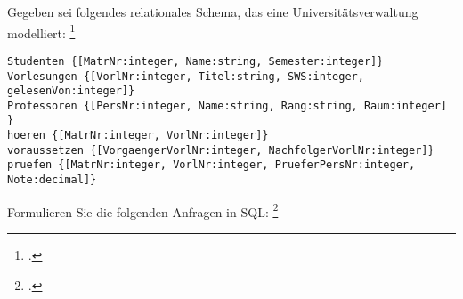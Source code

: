 \documentclass{bschlangaul-aufgabe}
\begin{document}

Gegeben sei folgendes relationales Schema, das eine
Universitätsverwaltung modelliert:
\footcite[Aufgabe 3: SQL]{db:pu:2}

\begin{verbatim}
Studenten {[MatrNr:integer, Name:string, Semester:integer]}
Vorlesungen {[VorlNr:integer, Titel:string, SWS:integer, gelesenVon:integer]}
Professoren {[PersNr:integer, Name:string, Rang:string, Raum:integer] }
hoeren {[MatrNr:integer, VorlNr:integer]}
voraussetzen {[VorgaengerVorlNr:integer, NachfolgerVorlNr:integer]}
pruefen {[MatrNr:integer, VorlNr:integer, PrueferPersNr:integer, Note:decimal]}
\end{verbatim}

\noindent
Formulieren Sie die folgenden Anfragen in SQL:
\footcite[Thema 2 Aufgabe 3]{66113:2003:03}
\end{document}
